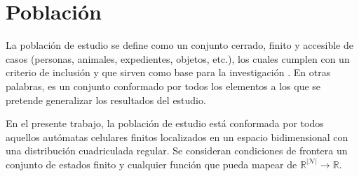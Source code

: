 \section{Población}

La población de estudio se define como un conjunto cerrado, finito y accesible de casos (personas, animales, expedientes, objetos, etc.), los cuales cumplen con un criterio de inclusión y que sirven como base para la investigación \cite{poblacion}. En otras palabras, es un conjunto conformado por todos los elementos a los que se pretende generalizar los resultados del estudio.

En el presente trabajo, la población de estudio está conformada por todos aquellos autómatas celulares finitos localizados en un espacio bidimensional con una distribución cuadriculada regular. Se consideran condiciones de frontera un conjunto de estados finito y cualquier función que pueda mapear de $\mathbb{R}^{|\mathcal{N}|} \to \mathbb{R}$.


